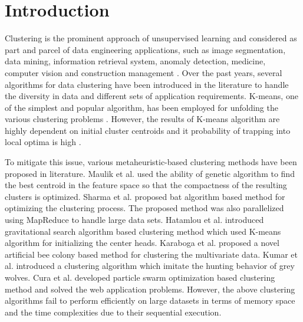\documentclass[review]{elsarticle}
\begin{document}
\section{Introduction} \label{sec:intro}

 Clustering is the prominent approach of unsupervised learning and considered as part and parcel of data engineering applications, such as  image segmentation, data mining, information retrieval system, anomaly detection, medicine, computer vision and construction management \cite{fayyad2002information, friedman2007anomaly, liao2008mri, forgy1965cluster}. Over the past years, several algorithms for data clustering have been introduced in the literature to handle the diversity in data and different sets of application requirements. K-means, one of the simplest and popular algorithm, has been employed for unfolding the various clustering problems \cite{xu2005} \cite{kaufman2009finding}. However, the results of K-means algorithm are highly dependent on initial cluster centroids and it probability of trapping into local optima is high \cite{kao2008hybridized}.

   To mitigate this issue, various metaheuristic-based clustering methods have been proposed in literature. Maulik et al. \cite{maulik2000genetic} used the ability of genetic algorithm to find the best centroid in the feature space so that the compactness of the resulting clusters is optimized. Sharma et al. \cite{ashish2018parallel} proposed bat algorithm based method for optimizing the clustering process. The proposed method was also parallelized using MapReduce to handle large data sets. Hatamlou et al. \cite{hatamlou2012combined} introduced gravitational search algorithm based clustering method which used K-means algorithm for initializing the center heads. Karaboga et al. \cite{karaboga2011novel} proposed a novel artificial bee colony based method for clustering the multivariate data. Kumar et al. \cite{kumar2017grey} introduced a clustering algorithm which imitate the hunting behavior of grey wolves. Cura et al. \cite{alam2008particle} developed particle swarm optimization based clustering method and solved the web application problems. However, the above clustering algorithms fail to perform efficiently on large datasets in terms of memory space and the time complexities due to their sequential execution. 
\end{document}
